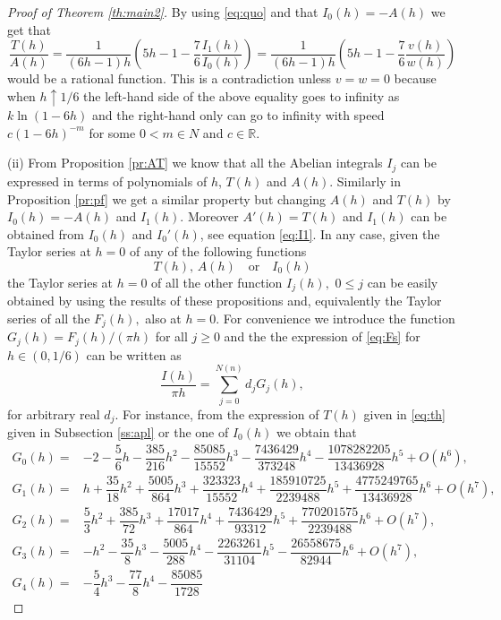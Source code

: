 \documentclass[12pt,a4paper,reqno]{amsart}
\newcommand{\R}{\mathbb{R}}
\begin{document}
\begin{proof}[Proof of Theorem \ref{th:main2}]
By using \eqref{eq:quo} and that $I_0(h)=-A(h)$ we get that
\[
\frac{T(h)}{A(h)}=\frac1{(6h-1)h}\left(5h-1-\frac76\frac{I_1(h)}{I_0(h)}\right)=\frac1{(6h-1)h}\left(5h-1-\frac76\frac{v(h)}{w(h)}\right)
\]
would be a rational function. This is a contradiction unless $v=w=0$
because when $h\uparrow1/6$ the left-hand side  of the above
equality goes to infinity as $k\ln(1-6h)$  and the right-hand only
can go to infinity with speed $c(1-6h)^{-m}$ for some $0<m\in N$ and
$c\in\R.$

(ii) From Proposition \ref{pr:AT} we know that all the Abelian
integrals $I_j$ can be expressed in terms of polynomials of $h$,
$T(h)$ and $A(h).$ Similarly in Proposition \ref{pr:pf} we get a
similar property but changing $A(h)$ and $T(h)$ by $I_0(h)=-A(h)$
and $I_1(h).$ Moreover $A'(h)=T(h)$ and $I_1(h)$ can be obtained
from $I_0(h)$ and $I_0'(h)$, see equation \eqref{eq:I1}. In any
case, given the Taylor series at $h=0$ of any of the following
functions
\[
T(h),\, A(h) \quad \mbox{or}\quad I_0(h)
\]
the Taylor series at $h=0$ of all the other function $I_j(h),$ $0\le
j$ can be easily obtained by using the results of these propositions
and, equivalently the Taylor series of all the $F_j(h),$ also at
$h=0.$   For convenience we introduce the function $G_j(h)=
F_j(h)/(\pi h)$  for all $j\ge0$ and the the expression of
\eqref{eq:Fs} for $h\in(0,1/6)$ can be written as
\begin{equation*}
\frac{  I(h)}{\pi h}=\sum_{j=0}^{N(n)} d_j G_j(h),
\end{equation*}
for arbitrary real $d_j.$ For instance, from the expression of
$T(h)$ given in \eqref{eq:th} given in Subsection \ref{ss:apl} or
the one of $I_0(h)$ we obtain that
\begin{align*}
G_{0}(h) =&  -2 - \dfrac{5}{6}  h - \dfrac{385}{216}  h^2 -
\dfrac{85085}{15552}  h^3  - \dfrac{7436429}{373248}
 h^4 - \dfrac{1078282205}{13436928}  h^5  +O(h^6),\\
G_1(h) =&  h + \dfrac{35}{18} h^2 + \dfrac{5005}{864} h^3 +
\dfrac{323323}{15552}h^4 + \dfrac{185910725}{2239488}h^5 +
 \dfrac{4775249765}{13436928}h^6  +O(h^7),\\
G_2(h) =&  \dfrac{5}{3} h^2 + \dfrac{385}{72}h^3+ \dfrac{17017}{864}h^4 + \dfrac{7436429}{93312}h^5+  \dfrac{770201575}{2239488}h^6 +O(h^7),\\
G_3(h) =& -h ^2 - \dfrac{35}{8} h^3- \dfrac{5005}{288} h^4 -
\dfrac{2263261}{31104} h^5-  \dfrac{26558675}{82944}
h^6+O(h^7),\\
G_4(h) =&   -\dfrac{5}{4} h^3- \dfrac{77}{8} h^4-\dfrac{85085}{1728}

\end{align*}
\end{proof}
\end{document}
